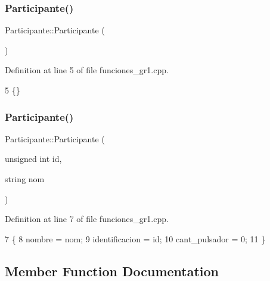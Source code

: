 \subsubsection{\texorpdfstring{Participante()}{Participante()}\hspace{0.1cm}{\footnotesize\ttfamily [1/2]}}
{\footnotesize\ttfamily Participante\+::\+Participante (\begin{DoxyParamCaption}{ }\end{DoxyParamCaption})}



Definition at line 5 of file funciones\+\_\+gr1.\+cpp.


\begin{DoxyCode}
5 \{\}
\end{DoxyCode}
\mbox{\label{classParticipante_ac84681fe84456274ce473271e7f7c142}} 
\subsubsection{\texorpdfstring{Participante()}{Participante()}\hspace{0.1cm}{\footnotesize\ttfamily [2/2]}}
{\footnotesize\ttfamily Participante\+::\+Participante (\begin{DoxyParamCaption}\item[{unsigned int}]{id,  }\item[{string}]{nom }\end{DoxyParamCaption})}



Definition at line 7 of file funciones\+\_\+gr1.\+cpp.


\begin{DoxyCode}
7                                                      \{
8     nombre = nom;
9     identificacion = id;
10     cant\_pulsador = 0;
11 \}
\end{DoxyCode}


\subsection{Member Function Documentation}
\mbox{\label{classParticipante_ac466291837016af5a0fc0cf0d0fbaf00}} 

